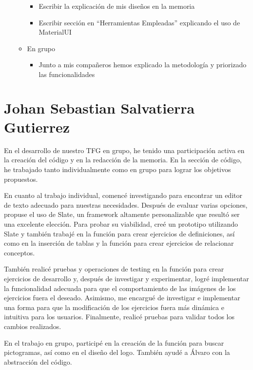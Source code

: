 \begin{itemize}
\begin{itemize}
\begin{itemize}
                        \item Escribir la explicación de mis diseños en la memoria
                        \item Escribir sección en “Herramientas Empleadas” explicando el uso de MaterialUI
                    \end{itemize}
              \item En grupo
                    \begin{itemize}
                        \item Junto a mis compañeros hemos explicado la metodología y priorizado las funcionalidades
                    \end{itemize}
          \end{itemize}
\end{itemize}

\section{Johan Sebastian Salvatierra Gutierrez}
En el desarrollo de nuestro TFG en grupo, he tenido una participación activa en la creación del código y en la redacción de la memoria. En la sección de código, he trabajado tanto individualmente como en grupo para lograr los objetivos propuestos.

En cuanto al trabajo individual, comencé investigando para encontrar un editor de texto adecuado para nuestras necesidades. Después de evaluar varias opciones, propuse el uso de Slate, un framework altamente personalizable que resultó ser una excelente elección. Para probar su viabilidad, creé un prototipo utilizando Slate y también trabajé en la función para crear ejercicios de definiciones, así como en la inserción de tablas y la función para crear ejercicios de relacionar conceptos.

También realicé pruebas y operaciones de testing en la función para crear ejercicios de desarrollo y, después de investigar y experimentar, logré implementar la funcionalidad adecuada para que el comportamiento de las imágenes de los ejercicios fuera el deseado. Asimismo, me encargué de investigar e implementar una forma para que la modificación de los ejercicios fuera más dinámica e intuitiva para los usuarios. Finalmente, realicé pruebas para validar todos los cambios realizados.

En el trabajo en grupo, participé en la creación de la función para buscar pictogramas, así como en el diseño del logo. También ayudé a Álvaro con la abstracción del código.


